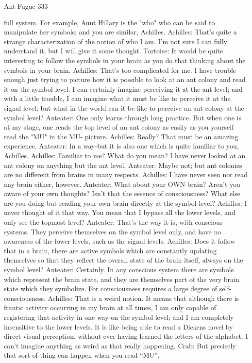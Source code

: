 Ant Fugue                                                                              333

    full system. For example, Aunt Hillary is the "who" who can be said to manipulate
    her symbols; and you are similar, Achilles.
Achilles: That's quite a strange characterization of the notion of who I am. I'm not sure I
    can fully understand it, but I will give it some thought.
Tortoise: It would be quite interesting to follow the symbols in your brain as you do that
    thinking about the symbols in your brain.
Achilles: That's too complicated for me. I have trouble enough just trying to picture how
    it is possible to look at an ant colony and read it on the symbol level. I can certainly
    imagine perceiving it at the ant level; and with a little trouble, I can imagine what it
    must be like to perceive it at the signal level; but what in the world can it be like to
    perceive an ant colony at the symbol level?
Anteater: One only learns through long practice. But when one is at my stage, one reads
    the top level of an ant colony as easily as you yourself read the "MU" in the MU-
    picture.
Achilles: Really? That must be an amazing experience.
Anteater: In a way-but it is also one which is quite familiar to you, Achilles.
Achilles: Familiar to me? What do you mean? I have never looked at an ant colony on
    anything but the ant level.
Anteater: Maybe not; but ant colonies are no different from brains in many respects.
Achilles: I have never seen nor read any brain either, however.
Anteater: What about your OWN brain? Aren't you aware of your own thoughts? Isn't
    that the essence of consciousness? What else are you doing but reading your own
    brain directly at the symbol level?
Achilles: I never thought of it that way. You mean that I bypass all the lower levels, and
    only see the topmost level?
Anteater: That's the way it is, with conscious systems. They perceive themselves on the
    symbol level only, and have no awareness of the lower levels, such as the signal
    levels.
Achilles: Does it follow that in a brain, there are active symbols which are constantly
    updating themselves so that they reflect the overall state of the brain itself, always on
    the symbol level?
Anteater: Certainly. In any conscious system there are symbols which represent the brain
    state, and they are themselves part of the very brain state which they symbolize. For
    consciousness requires a large degree of self-consciousness.
Achilles: That is a weird notion. It means that although there is frantic activity occurring
    in my brain at all times, I am only capable of registering that activity in one way-on
    the symbol level; and I am completely insensitive to the lower levels. It is like being
    able to read a Dickens novel by direct visual perception, without ever having learned
    the letters of the alphabet. I can't imagine anything as weird as that really happening.
Crab: But precisely that sort of thing can happen when you read “MU”,




